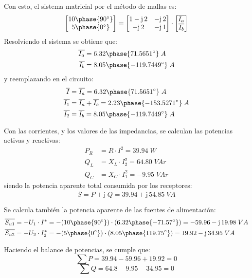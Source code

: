 \documentclass[11pt]{book} %
\begin{document}
\begin{example}
		Con esto, el sistema matricial por el método de mallas es: 
		\begin{equation*}
			\begin{bmatrix}
				10\phase{90^\circ} \\
				5\phase{0^\circ} 
			\end{bmatrix}
			=
			\begin{bmatrix}
				1-\mathrm{j}\,2 & -\mathrm{j}\,2 \\
				-\mathrm{j}\,2 & -\mathrm{j}\,1 \\
			\end{bmatrix}
			\cdot 
			\begin{bmatrix}
				\overline{I_a}\\
				\overline{I_b}
			\end{bmatrix}
		\end{equation*}
		Resolviendo el sistema se obtiene que:
		\begin{align*}
			\overline{I_a}&= 6.32\phase{71.5651^\circ}\;A\\
			\overline{I_b}&= 8.05\phase{-119.7449^\circ}\;A
		\end{align*}
		y reemplazando en el circuito: 
		\begin{align*}
			\overline{I}&=\overline{I_a}=6.32\phase{71.5651^\circ}\;A\\
			\overline{I_1}&=\overline{I_a}+\overline{I_b}=2.23\phase{-153.5271^\circ}\;A\\
			\overline{I_2}&=\overline{I_b}=8.05\phase{-119.7449^\circ}\;A
		\end{align*}
		
		
		Con las corrientes, y los valores de las impedancias, se calculan las potencias activas y reactivas:
		\begin{align*}
			P_R&=R\cdot I^2=39.94\;W\\
			Q_L &= X_L\cdot I_2^2=64.80\;VAr\\
			Q_C&=X_C\cdot I_1^2=-9.95\;VAr
		\end{align*}
		siendo la potencia aparente total consumida por los receptores:
		\begin{equation*}
			\overline{S}=P+\mathrm{j}\;Q=39.94+\mathrm{j}\,54.85\;VA
		\end{equation*}
		
		Se calcula también la potencia aparente de las fuentes de alimentación:
		\begin{align*}
			    \overline{S_{u1}}&=-U_1\cdot I^*=-(10\phase {90^\circ})\cdot (6.32\phase {-71.57^\circ})=-59.96-\mathrm{j}\,19.98\;VA\\
			    \overline{S_{u2}}&=-U_2\cdot I_2^*=-(5\phase{0^\circ})\cdot (8.05\phase{119.75^\circ})=19.92-\mathrm{j}\,34.95\;VA
			\end{align*}
		
		Haciendo el balance de potencias, se cumple que:
		\begin{equation*}
			    \sum P = 39.94-59.96+19.92=0
			\end{equation*}
		\begin{equation*}
			    \sum Q = 64.8-9.95-34.95=0
			\end{equation*}
	\end{example}
	
\end{document}
